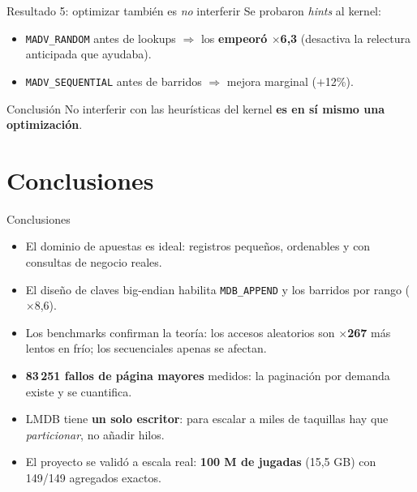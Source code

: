 \documentclass[aspectratio=169,11pt]{beamer}
\begin{document}
\begin{frame}{Resultado 5: optimizar también es \emph{no} interferir}
  Se probaron \emph{hints} al kernel:
  \begin{itemize}
    \item \texttt{MADV\_RANDOM} antes de lookups $\Rightarrow$ los
      \textbf{empeoró $\times$6,3} (desactiva la relectura anticipada que
      ayudaba).
    \item \texttt{MADV\_SEQUENTIAL} antes de barridos $\Rightarrow$ mejora
      marginal ($+$12\%).
  \end{itemize}

  \vspace{0.3cm}
  \begin{block}{Conclusión}
    No interferir con las heurísticas del kernel \textbf{es en sí mismo una
    optimización}.
  \end{block}
\end{frame}

\section{Conclusiones}

\begin{frame}{Conclusiones}
  \begin{itemize}
    \item El dominio de apuestas es ideal: registros pequeños, ordenables y
      con consultas de negocio reales.
    \item El diseño de claves big-endian habilita \texttt{MDB\_APPEND} y los
      barridos por rango ($\times$8,6).
    \item Los benchmarks confirman la teoría: los accesos aleatorios son
      \textbf{$\times$267} más lentos en frío; los secuenciales apenas se
      afectan.
    \item \textbf{83\,251 fallos de página mayores} medidos: la paginación por
      demanda existe y se cuantifica.
    \item LMDB tiene \textbf{un solo escritor}: para escalar a miles de
      taquillas hay que \emph{particionar}, no añadir hilos.
    \item El proyecto se validó a escala real: \textbf{100 M de jugadas}
      (15,5 GB) con 149/149 agregados exactos.
  \end{itemize}
\end{frame}
\end{document}
